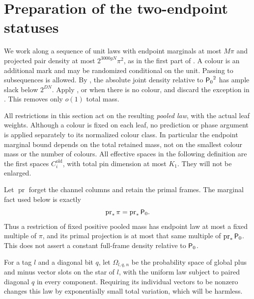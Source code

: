 \section{Preparation of the two-endpoint statuses}
\label{sec:preparation}

We work along a sequence of unit laws with endpoint marginals at
most \(M\pi\) and projected pair density at most
\(2^{3000gN}\pi^2\), as in the first part of
.  A colour is an additional mark and
may be randomized conditional on the unit.  Passing to subsequences
is allowed.  By , the absolute joint
density relative to \({\mathsf P_0}^2\) has ample slack below
\(2^{DN}\).  Apply , or
 when there is no colour, and discard the
exception in .  This removes only
\(o(1)\) total mass.

All restrictions in this section act on the resulting \emph{pooled
law}, with the actual leaf weights.  Although a colour is fixed on
each leaf, no prediction or phase argument is applied separately to
its normalized colour class.  In particular the endpoint marginal
bound depends on the total retained mass, not on the smallest
colour mass or the number of colours.  All effective spaces in the
following definition are the first spaces
\(C_i^{\mathrm{old}}\), with total pin dimension at most \(K_1\).
They will not be enlarged.

Let \(\operatorname{pr}\) forget the channel columns and retain the
primal frames.  The marginal fact used below is exactly
\[
 \operatorname{pr}_*\pi=\operatorname{pr}_*{\mathsf P_0}.
\]
Thus a restriction of fixed positive pooled mass has endpoint law
at most a fixed multiple of \(\pi\), and its primal projection is
at most that same multiple of \(\operatorname{pr}_*{\mathsf P_0}\).
This does not assert a constant full-frame density relative to
\({\mathsf P_0}\).

For a tag \(l\) and a diagonal bit \(q\), let
\(\Omega_{l,q,n}\) be the probability space of global plus and minus
vector slots on the star of \(l\), with the uniform law subject to
paired diagonal \(q\) in every component. Requiring its individual
vectors to be nonzero changes this law by exponentially small total
variation, which will be harmless.

